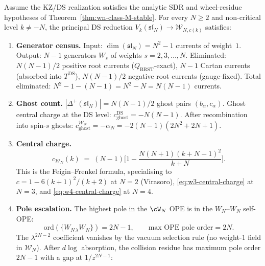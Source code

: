 \begin{theorem}
\label{thm:universal-ds-transport}
%
Assume the KZ/DS realization satisfies the analytic SDR and
wheel-residue hypotheses of Theorem~\textup{\ref{thm:wn-class-M-stable}}.
For every $N \ge 2$ and non-critical level $k \ne -N$,
the principal DS reduction $V_k(\mathfrak{sl}_N) \to
\mathcal{W}_{N,c(k)}$ satisfies:
\begin{enumerate}[label=\textup{(\roman*)}]
\item \textbf{Generator census.}
 Input: $\dim(\mathfrak{sl}_N) = N^2 - 1$ currents of weight~$1$.
 Output: $N - 1$ generators $W_s$ of weights $s = 2, 3, \ldots, N$.
 Eliminated: $N(N-1)/2$ positive root currents
 \textup{(}$Q_{\mathrm{BRST}}$-exact\textup{)},
 $N - 1$ Cartan currents
 \textup{(}absorbed into $T^{\mathrm{DS}}$\textup{)},
 $N(N-1)/2$ negative root currents
 \textup{(}gauge-fixed\textup{)}.
 Total eliminated: $N^2 - 1 - (N - 1) = N^2 - N
 = N(N-1)$ currents.
\item \textbf{Ghost count.}
 $|\Delta^+(\mathfrak{sl}_N)| = N(N-1)/2$ ghost pairs
 $(b_\alpha, c_\alpha)$. Ghost central charge at the DS level:
 $c_{\mathrm{ghost}}^{\mathrm{DS}} = -N(N-1)$. After recombination
 into spin-$s$ ghosts:
 $c_{\mathrm{ghost}}^{\mathcal{W}_N} = -\alpha_N
 = -2(N-1)(2N^2 + 2N + 1)$.
\item \textbf{Central charge.}
 \begin{equation}
 \label{eq:wN-central-charge-ds}
 c_{\mathcal{W}_N}(k)
 \;=\; (N-1)\biggl[1 - \frac{N(N+1)(k + N - 1)^2}{k + N}\biggr].
 \end{equation}
 This is the Feigin--Frenkel formula, specialising to
 $c = 1 - 6(k+1)^2/(k+2)$ at $N = 2$ \textup{(Virasoro)},
 \eqref{eq:w3-central-charge} at $N = 3$, and
 \eqref{eq:w4-central-charge} at $N = 4$.
\item \textbf{Pole escalation.}
 The highest pole in the $\cW_N$ OPE is in the
 $W_N$--$W_N$ self-OPE:
 \begin{equation}
 \label{eq:wn-max-pole}
 \mathrm{ord}(\{W_{N\,\lambda} W_N\}) = 2N - 1,
 \qquad
 \text{max OPE pole order} = 2N.
 \end{equation}
 The $\lambda^{2N-2}$ coefficient vanishes by the vacuum selection
 rule \textup{(}no weight-$1$ field in $\mathcal{W}_N$\textup{)}.
 After $d\log$ absorption, the collision residue has maximum pole
 order $2N - 1$ with a gap at $1/z^{2N-1}$:

\end{enumerate}
\end{theorem}
